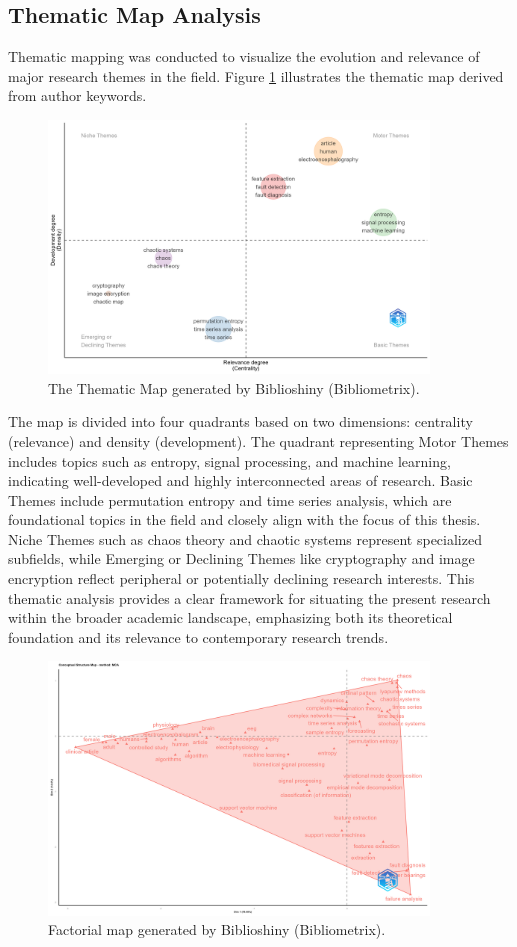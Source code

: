 \subsection{Thematic Map Analysis}
Thematic mapping was conducted to visualize the evolution and relevance of major research themes in the field. Figure \ref{fig:ThematicMap} illustrates the thematic map derived from author keywords.
\begin{figure}[H]
	\centering
	\includegraphics[width=0.9\textwidth]{ThematicMap}
	\caption{The Thematic Map generated by Biblioshiny (Bibliometrix).}
	\label{fig:ThematicMap}
\end{figure}
The map is divided into four quadrants based on two dimensions: centrality (relevance) and density (development). The quadrant representing Motor Themes includes topics such as entropy, signal processing, and machine learning, indicating well-developed and highly interconnected areas of research. Basic Themes include permutation entropy and time series analysis, which are foundational topics in the field and closely align with the focus of this thesis. Niche Themes such as chaos theory and chaotic systems represent specialized subfields, while Emerging or Declining Themes like cryptography and image encryption reflect peripheral or potentially declining research interests. This thematic analysis provides a clear framework for situating the present research within the broader academic landscape, emphasizing both its theoretical foundation and its relevance to contemporary research trends.
\begin{figure}[H]
	\centering
	\includegraphics[width=0.9\textwidth]{FactorialMap}
	\caption{Factorial map generated by Biblioshiny (Bibliometrix).}
	\label{fig:factorialMap}
\end{figure}
